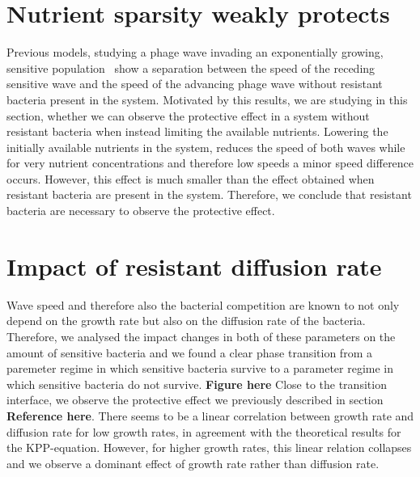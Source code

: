 \section{Nutrient sparsity weakly protects}
Previous models, studying a phage wave invading an exponentially growing, sensitive population~\cite{BLA} show a separation between the speed of the receding sensitive wave and the speed of the advancing phage wave without resistant bacteria present in the system. Motivated by this results, we are studying in this section, whether we can observe the protective effect in a system without resistant bacteria when instead limiting the available nutrients. Lowering the initially available nutrients in the system, reduces the speed of both waves while for very nutrient concentrations and therefore low speeds a minor speed difference occurs. However, this effect is much smaller than the effect obtained when resistant bacteria are present in the system. Therefore, we conclude that resistant bacteria are necessary to observe the protective effect.
\section{Impact of resistant diffusion rate}
Wave speed and therefore also the bacterial competition are known to not only depend on the growth rate but also on the diffusion rate of the bacteria. Therefore, we analysed the impact changes in both of these parameters on the amount of sensitive bacteria and we found a clear phase transition from a paremeter regime in which sensitive bacteria survive to a parameter regime in which sensitive bacteria do not survive. \textbf{Figure here} Close to the transition interface, we observe the protective effect we previously described in section \textbf{Reference here}. There seems to be a linear correlation between growth rate and diffusion rate for low growth rates, in agreement with the theoretical results for the KPP-equation. However, for higher growth rates, this linear relation collapses and we observe a dominant effect of growth rate rather than diffusion rate.

